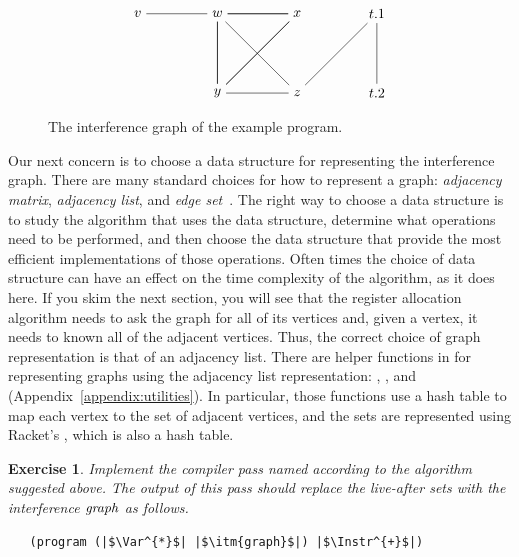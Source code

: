 \documentclass[11pt]{book}
\newtheorem{exercise}[theorem]{Exercise}
\begin{document}
\begin{figure}[tbp]
\large
\[
\begin{tikzpicture}[baseline=(current  bounding  box.center)]
\node (v) at (0,0)   {$v$};
\node (w) at (2,0)   {$w$};
\node (x) at (4,0)   {$x$};
\node (t1) at (6,0)   {$t.1$};
\node (y) at (2,-2)  {$y$};
\node (z) at (4,-2)  {$z$};
\node (t2) at (6,-2) {$t.2$};

\draw (v) to (w);
\foreach \i in {w,x,y}
{
  \foreach \j in {w,x,y}
  {
    \draw (\i) to (\j);
  }
}
\draw (z) to (w);
\draw (z) to (y);
\draw (t1) to (z);
\draw (t2) to (t1);
\end{tikzpicture}
\]
\caption{The interference graph of the example program.}
\label{fig:interfere}
\end{figure}

Our next concern is to choose a data structure for representing the
interference graph. There are many standard choices for how to
represent a graph: \emph{adjacency matrix}, \emph{adjacency list}, and
\emph{edge set}~\citep{Cormen:2001uq}. The right way to choose a data
structure is to study the algorithm that uses the data structure,
determine what operations need to be performed, and then choose the
data structure that provide the most efficient implementations of
those operations. Often times the choice of data structure can have an
effect on the time complexity of the algorithm, as it does here. If
you skim the next section, you will see that the register allocation
algorithm needs to ask the graph for all of its vertices and, given a
vertex, it needs to known all of the adjacent vertices. Thus, the
correct choice of graph representation is that of an adjacency
list. There are helper functions in  for
representing graphs using the adjacency list representation:
, , and 
(Appendix~\ref{appendix:utilities}).  In particular, those functions
use a hash table to map each vertex to the set of adjacent vertices,
and the sets are represented using Racket's , which is also a
hash table.

\begin{exercise}\normalfont
Implement the compiler pass named  according
to the algorithm suggested above.  The output of this pass should
replace the live-after sets with the interference $\mathit{graph}$ as
follows.
\begin{lstlisting}
   (program (|$\Var^{*}$| |$\itm{graph}$|) |$\Instr^{+}$|)
\end{lstlisting}

\end{exercise}
\end{document}
